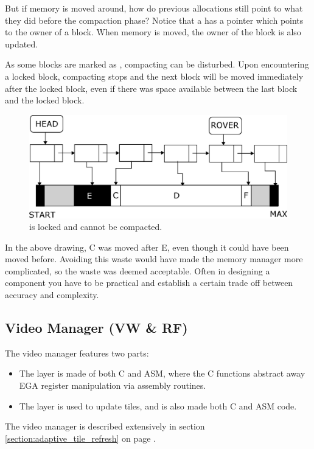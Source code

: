 \documentclass[book.tex]{subfiles}
\begin{document}
 \par
But if memory is moved around, how do previous allocations still point to what they did before the compaction phase? Notice that a  has a  pointer which points to the owner of a block.  When memory is moved, the owner of the block is also updated.\\
\par
As some blocks are marked as , compacting can be disturbed. Upon encountering a locked block, compacting stops and the next block will be moved immediately after the locked block, even if there was space available between the last block and the locked block.\\
   \par
\begin{figure}[H]
\centering
 \includegraphics[width=\textwidth]{imgs/drawings/mm_bad_compact.eps}
 \caption{ is locked and cannot be compacted.}
 \end{figure}
 \par
  In the above drawing, C was moved after E, even though it could have been moved before. Avoiding this waste would have made the memory manager more complicated, so the waste was deemed acceptable. Often in designing a component you have to be practical and establish a certain trade off between accuracy and complexity.\\
  \par
  
  
  


\subsection{Video Manager (VW \& RF)}
The video manager features two parts:
\begin{itemize}
\item The  layer is made of both C and ASM, where the C functions abstract away EGA register manipulation via assembly routines. 
\item The  layer is used to update tiles, and is also made both C and ASM code.
\end{itemize}
The video manager is described extensively in section \ref{section:adaptive_tile_refresh} on page \pageref{section:adaptive_tile_refresh}.
\par
\end{document}
